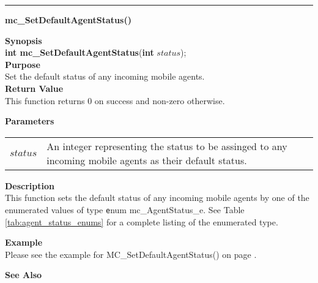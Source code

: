 \noindent
\vspace{5pt}
\rule{6.5in}{0.015in}
\noindent
{\LARGE \bf mc\_SetDefaultAgentStatus()}\\
{}

\noindent
{\bf Synopsis}\\
{\bf int mc\_SetDefaultAgentStatus}({\bf int} $status$);\\

\noindent
{\bf Purpose}\\
Set the default status of any incoming mobile agents.\\

\noindent
{\bf Return Value}\\
This function returns 0 on success and non-zero otherwise.

\noindent
{\bf Parameters}
\vspace{-0.1in}
\begin{description}
\item
\begin{tabular}{p{10 mm}p{145 mm}}
$status$ & An integer representing the status to be assinged to any incoming
mobile agents as their default status.
\end{tabular}
\end{description}

\noindent
{\bf Description}\\
This function sets the default status of any incoming mobile agents by one of 
the enumerated values of type {\texttt enum mc\_AgentStatus\_e}. See Table
\vref{tab:agent_status_enums} for a complete listing of the enumerated type.

\noindent
{\bf Example}\\
Please see the example for MC\_SetDefaultAgentStatus() on page
\pageref{api:MC_SetDefaultAgentStatus()}.
\noindent

\noindent
{\bf See Also}\\

